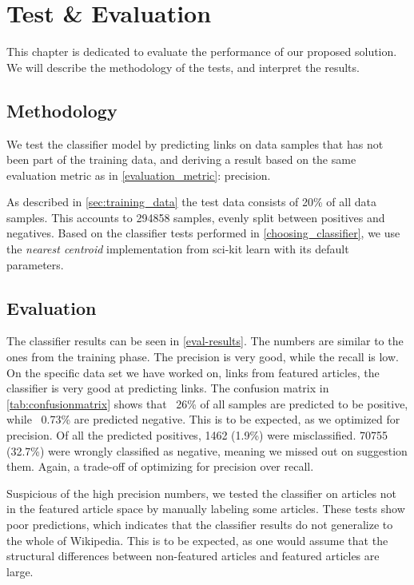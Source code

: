 \chapter{Test \& Evaluation}\label{chap:testeval}
This chapter is dedicated to evaluate the performance of our proposed solution. We will describe the methodology of the tests, and interpret the results.

\section{Methodology}
We test the classifier model by predicting links on data samples that has not been part of the training data, and deriving a result based on the same evaluation metric as in \cref{evaluation_metric}: precision.

As described in \cref{sec:training_data} the test data consists of 20\% of all data samples. This accounts to \num{294858} samples, evenly split between positives and negatives. Based on the classifier tests performed in \cref{choosing_classifier}, we use the \emph{nearest centroid} implementation from sci-kit learn with its default parameters.

\section{Evaluation}
The classifier results can be seen in \cref{eval-results}. The numbers are similar to the ones from the training phase. The precision is very good, while the recall is low. On the specific data set we have worked on, links from featured articles, the classifier is very good at predicting links. The confusion matrix in \cref{tab:confusionmatrix} shows that ~26\% of all samples are predicted to be positive, while ~0.73\% are predicted negative. This is to be expected, as we optimized for precision. Of all the predicted positives, 1462 (1.9\%) were misclassified. \num{70755} (32.7\%) were wrongly classified as negative, meaning we missed out on suggestion them. Again, a trade-off of optimizing for precision over recall.

Suspicious of the high precision numbers, we tested the classifier on articles not in the featured article space by manually labeling some articles. These tests show poor predictions, which indicates that the classifier results do not generalize to the whole of Wikipedia. This is to be expected, as one would assume that the structural differences between non-featured articles and featured articles are large.

